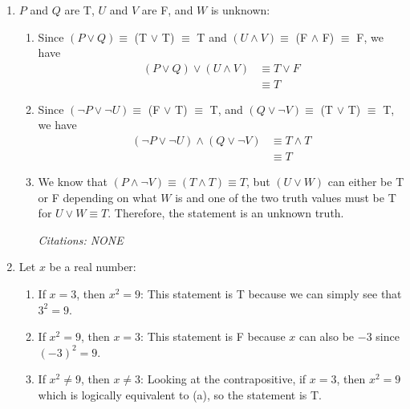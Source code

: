 \documentclass[11pt]{article}
\begin{document}



\begin{enumerate}
  \item $P$ and $Q$ are T, $U$ and $V$ are F, and $W$ is unknown:
  \begin{enumerate}
    \item Since $(P \lor Q) \equiv$ (T $\lor$ T) $\equiv$ T
    and $(U \land V) \equiv$ (F $\land$ F) $\equiv$ F, we have
    \begin{align*}
      (P \lor Q) \lor (U \land V) &\equiv T \lor F \\
      &\equiv T
    \end{align*}
    \item Since $(\neg P \lor \neg U) \equiv$ (F $\lor$ T) $\equiv$ T,
    and $(Q \lor \neg V) \equiv$ (T $\lor$ T) $\equiv$ T, we have
    \begin{align*}
      (\neg P \lor \neg U) \land (Q \lor \neg V)
      &\equiv T \land T \\
      &\equiv T
    \end{align*}
    \item We know that $(P \land \neg V) \equiv (T \land T) \equiv T$, but
    $(U \lor W)$ can either be T or F depending on what $W$ is and one of the two truth values
    must be T for $U \lor W \equiv T$. Therefore, the statement is an unknown truth.

    \textit{Citations: NONE}
  \end{enumerate}

  \newpage
  \item Let $x$ be a real number:
  \begin{enumerate}
    \item If $x = 3$, then $x^2 = 9$:
    This statement is T because we can simply see that $3^2 = 9$.

    \item If $x^2 = 9$, then $x = 3$:
    This statement is F because $x$ can also be $-3$ since $(-3)^2 = 9$.

    \item If $x^2 \neq 9$, then $x \neq 3$:
    Looking at the contrapositive, if $x = 3$, then $x^2 = 9$ which is logically equivalent to (a),
    so the statement is T.


\end{enumerate}
\end{enumerate}
\end{document}
